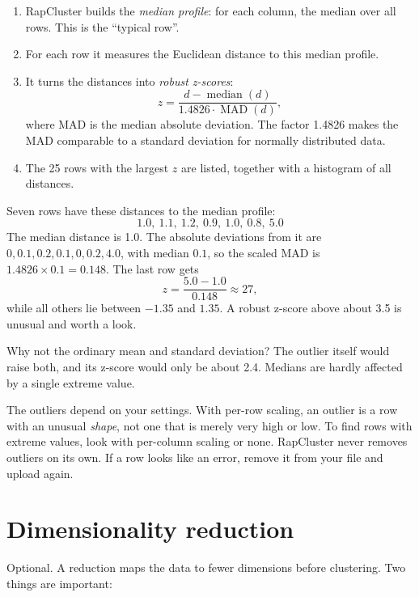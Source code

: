 \documentclass[11pt,a4paper]{article}
\begin{document}
\begin{enumerate}
  \item RapCluster builds the \emph{median profile}: for each column, the median over all rows. This is the
    ``typical row''.
  \item For each row it measures the Euclidean distance to this median profile.
  \item It turns the distances into \emph{robust z-scores}:
    \[
      z = \frac{d - \operatorname{median}(d)}{1.4826\cdot\operatorname{MAD}(d)},
    \]
    where MAD is the median absolute deviation. The factor 1.4826 makes the MAD comparable to a standard
    deviation for normally distributed data.
  \item The 25 rows with the largest $z$ are listed, together with a histogram of all distances.
\end{enumerate}

\begin{example}
Seven rows have these distances to the median profile:
\[
  1.0,\ 1.1,\ 1.2,\ 0.9,\ 1.0,\ 0.8,\ 5.0
\]
The median distance is 1.0. The absolute deviations from it are $0, 0.1, 0.2, 0.1, 0, 0.2, 4.0$, with median
$0.1$, so the scaled MAD is $1.4826\times0.1=0.148$. The last row gets
\[
  z = \frac{5.0-1.0}{0.148} \approx 27,
\]
while all others lie between $-1.35$ and $1.35$. A robust z-score above about 3.5 is unusual and worth a look.

Why not the ordinary mean and standard deviation? The outlier itself would raise both, and its z-score would only
be about 2.4. Medians are hardly affected by a single extreme value.
\end{example}

The outliers depend on your settings. With per-row scaling, an outlier is a row with an unusual \emph{shape}, not
one that is merely very high or low. To find rows with extreme values, look with per-column scaling or none.
RapCluster never removes outliers on its own. If a row looks like an error, remove it from your file and upload
again.

\section{Dimensionality reduction}

Optional. A reduction maps the data to fewer dimensions before clustering. Two things are important:
\end{document}
